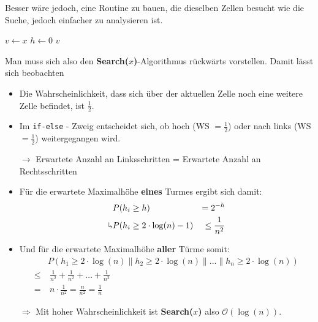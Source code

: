 \documentclass{scrartcl}%
\begin{document}
    Besser wäre jedoch, eine Routine zu bauen, die dieselben Zellen besucht wie die Suche, jedoch einfacher zu analysieren ist.

    \begin{algorithm}
        \begin{algorithmic}
            \STATE $v\gets x$
            \STATE $h\gets 0$
            \STATE
                \ELSE
                \ENDIF
            \ENDWHILE
            \STATE
            \RETURN $v$

        \end{algorithmic}
    \end{algorithm}

    Man muss sich also den \textbf{\textsf{Search($x$)}}-Algorithmus rückwärts vorstellen.
    Damit lässt sich beobachten

    \begin{itemize}
        \item Die Wahrscheinlichkeit, dass sich über der aktuellen Zelle noch eine weitere Zelle befindet, ist $\frac{1}{2}$.
        \item Im \texttt{if-else} - Zweig entscheidet sich, ob hoch (WS $=\frac{1}{2}$) oder nach links (WS $=\frac{1}{2}$) weitergegangen wird.
        \item [$\rightarrow$] Erwartete Anzahl an Linksschritten = Erwartete Anzahl an Rechtsschritten
        \item Für die erwartete Maximalhöhe \textbf{\textsf{eines}} Turmes ergibt sich damit:
        \begin{equation*}
            \begin{flalign}
                & P(h_i \geq h) &= 2^{-h} \\\nonumber
                \rotatebox[origin=c]{180}{$\Lsh$} & P(h_i \geq 2 \cdot \log(n) - 1) &\leq \frac{1}{n^2}
            \end{flalign}
        \end{equation*}
        \item Und für die erwartete Maximalhöhe \textbf{\textsf{aller}} Türme somit:
        \begin{equation*}
            \begin{flalign}
                & P(h_1 \geq 2 \cdot \log(n) \| h_2 \geq 2 \cdot \log(n) \| ... \| h_n \geq 2 \cdot \log(n))\\\nonumber
                \leq &\  \frac{1}{n^2} + \frac{1}{n^2} + \ldots + \frac{1}{n^2}\\\nonumber
                = &\  n\cdot \frac{1}{n^2} = \frac{n}{n^2} = \frac{1}{n}
            \end{flalign}
        \end{equation*}
        \item [$\Rightarrow$] Mit hoher Wahrscheinlichkeit ist \textbf{\textsf{Search($x$)}} also $\mathcal{O}(\log(n))$.
    \end{itemize}
\end{document}
